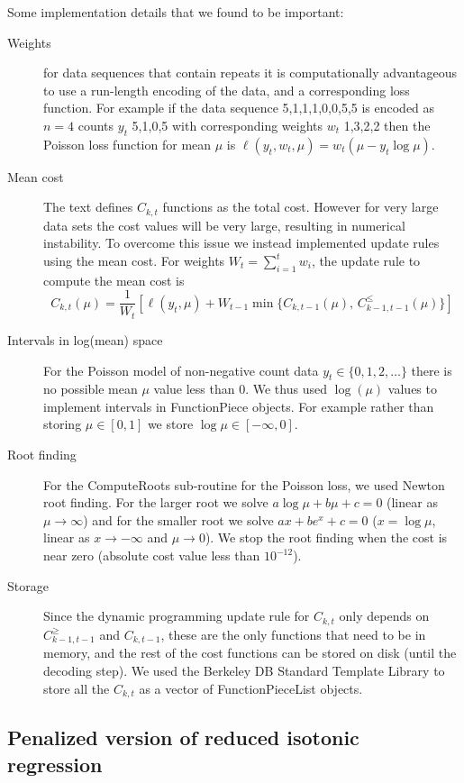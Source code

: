 \documentclass{article}
\begin{document}
Some implementation details that we found to be important:
\begin{description}
\item[Weights] for data sequences that contain repeats it is
  computationally advantageous to use a run-length encoding of the
  data, and a corresponding loss function. For example if the data
  sequence 5,1,1,1,0,0,5,5 is encoded as $n=4$ counts $y_t$ 5,1,0,5 with
  corresponding weights $w_t$ 1,3,2,2 then the Poisson loss function
  for mean $\mu$ is $\ell(y_t, w_t, \mu) = w_t(\mu- y_t\log \mu)$.
\item[Mean cost] The text defines $C_{k,t}$ functions as the total
  cost. However for very large data sets the cost values will be very
  large, resulting in numerical instability. To overcome this issue we
  instead implemented update rules using the mean cost.  For weights
  $W_{t}=\sum_{i=1}^t w_i$, the update rule to compute the mean cost is
$$  C_{k,t}(\mu) = \frac{1}{W_{t}} \left[\ell(y_t, \mu) + 
W_{t-1}
\min\{ C_{k,t-1}(\mu),\, C_{k-1,t-1}^\leq(\mu)  \}\right]$$
\item[Intervals in log(mean) space] For the Poisson model of
  non-negative count data $y_t\in\{0,1,2,\dots\}$ there is no possible
  mean $\mu$ value less than 0. We thus used $\log(\mu)$ values to
  implement intervals in FunctionPiece objects. For example rather
  than storing $\mu\in[0,1]$ we store $\log\mu\in[-\infty, 0]$.
\item[Root finding] For the ComputeRoots sub-routine for the Poisson
  loss, we used Newton root finding. For the larger root we solve
  $a\log\mu + b\mu + c = 0$ (linear as $\mu\rightarrow\infty$) and for
  the smaller root we solve $a x + be^x + c = 0$ ($x=\log \mu$, linear
  as $x\rightarrow -\infty$ and $\mu\rightarrow 0$). We stop the root
  finding when the cost is near zero (absolute cost value less
  than $10^{-12}$).
\item[Storage] Since the dynamic programming update rule for $C_{k,t}$
  only depends on $C_{k-1,t-1}^\geq$ and $C_{k,t-1}$, these are the
  only functions that need to be in memory, and the rest of the cost
  functions can be stored on disk (until the decoding step). We used
  the Berkeley DB Standard Template Library to store all the $C_{k,t}$
  as a vector of FunctionPieceList objects.
\end{description}

\subsection{Penalized version of reduced isotonic regression}
\end{document}
